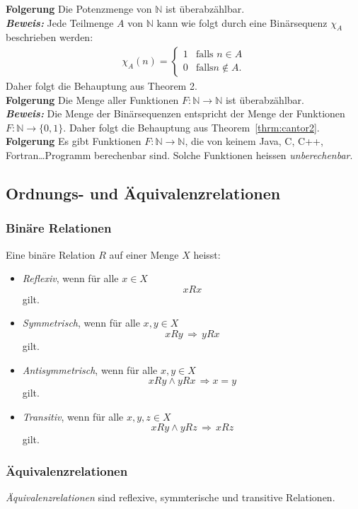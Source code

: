 \textbf{Folgerung }
Die Potenzmenge von $\mathbb{N}$ ist überabzählbar. \\
\textbf{\textit{Beweis: }}
Jede Teilmenge $A$ von $\mathbb{N}$ kann wie folgt durch eine Binärsequenz $\chi_A$ beschrieben werden:
\begin{align*}
\chi_A(n)=\begin{cases}
1&\text{falls } n\in A\\
0&\text{falls} n\notin A.
\end{cases}
\end{align*}
Daher folgt die Behauptung aus Theorem 2.\\
\textbf{Folgerung }
Die Menge aller Funktionen $F:\mathbb{N}\to\mathbb{N}$ ist überabzählbar. \\
\textbf{\textit{Beweis: }}
Die Menge der Binärsequenzen entspricht der Menge der Funktionen $F:\mathbb{N}\to\{0,1\}$. Daher folgt die Behauptung
aus Theorem~\ref{thrm:cantor2}. \\
\textbf{Folgerung }
Es gibt Funktionen $F:\mathbb{N}\to\mathbb{N}$, die von keinem Java, C, C++, Fortran\dots Programm berechenbar sind. Solche Funktionen heissen \textit{unberechenbar}.

\subsection{Ordnungs- und Äquivalenzrelationen}%
\label{sub:ordnungs_und_äquivalenzrelationen}

\subsubsection{Binäre Relationen}%
\label{ssub:binäre_relationen}
Eine binäre Relation $R$ auf einer Menge $X$ heisst:
    \begin{itemize}
    \item \textit{Reflexiv}, wenn für alle $x\in X$
    \[
    xRx
    \]
    gilt.
    \item \textit{Symmetrisch}, wenn für alle $x,y\in X$
    \[
    xRy\,\Rightarrow\, yRx
    \]
    gilt.
    \item \textit{Antisymmetrisch}, wenn für alle $x,y\in X$
    \[
xRy\land yRx\,\Rightarrow x=y
\]
gilt.
\item \textit{Transitiv}, wenn für alle $x,y,z\in X$
\[
xRy\land yRz\,\Rightarrow \, xRz
\]
gilt.
\end{itemize}
\subsubsection{Äquivalenzrelationen}%
\label{ssub:äquivalenzrelationen}
\textit{Äquivalenzrelationen} sind reflexive, symmterische und transitive Relationen.

